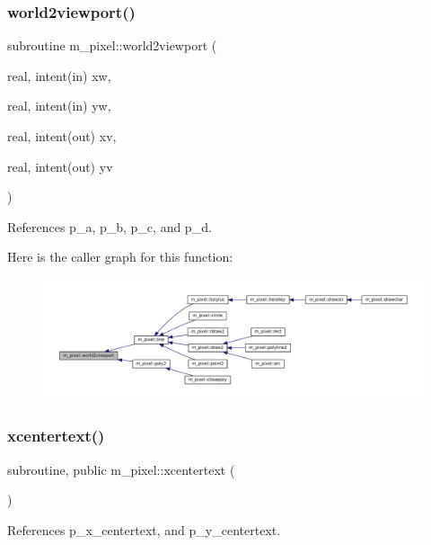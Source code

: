 \subsubsection{\texorpdfstring{world2viewport()}{world2viewport()}}
{\footnotesize\ttfamily subroutine m\+\_\+pixel\+::world2viewport (\begin{DoxyParamCaption}\item[{real, intent(in)}]{xw,  }\item[{real, intent(in)}]{yw,  }\item[{real, intent(out)}]{xv,  }\item[{real, intent(out)}]{yv }\end{DoxyParamCaption})\hspace{0.3cm}{\ttfamily [private]}}



References p\+\_\+a, p\+\_\+b, p\+\_\+c, and p\+\_\+d.

Here is the caller graph for this function\+:
\nopagebreak
\begin{figure}[H]
\begin{center}
\leavevmode
\includegraphics[width=350pt]{namespacem__pixel_a9d4aea8ae2eb15317b83fa03a11371b2_icgraph}
\end{center}
\end{figure}
\mbox{\label{namespacem__pixel_a1e0c43d36b35eafea921f91c31d8a478}} 
\subsubsection{\texorpdfstring{xcentertext()}{xcentertext()}}
{\footnotesize\ttfamily subroutine, public m\+\_\+pixel\+::xcentertext (\begin{DoxyParamCaption}{ }\end{DoxyParamCaption})}



References p\+\_\+x\+\_\+centertext, and p\+\_\+y\+\_\+centertext.

